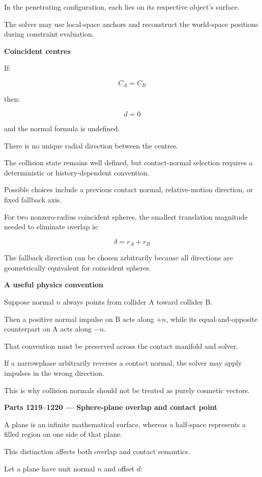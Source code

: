 In the penetrating configuration, each lies on its respective object's surface.

The solver may use local-space anchors and reconstruct the world-space positions during constraint evaluation.

\textbf{Coincident centres}

If:

\[
C_A=C_B
\]

then:

\[
d=0
\]

and the normal formula is undefined.

There is no unique radial direction between the centres.

The collision state remains well defined, but contact-normal selection requires a deterministic or history-dependent convention.

Possible choices include a previous contact normal, relative-motion direction, or fixed fallback axis.

For two nonzero-radius coincident spheres, the smallest translation magnitude needed to eliminate overlap is:

\[
\delta=r_A+r_B
\]

The fallback direction can be chosen arbitrarily because all directions are geometrically equivalent for coincident spheres.

\textbf{A useful physics convention}

Suppose normal \(n\) always points from collider A toward collider B.

Then a positive normal impulse on B acts along \(+n\), while its equal-and-opposite counterpart on A acts along \(-n\).

That convention must be preserved across the contact manifold and solver.

If a narrowphase arbitrarily reverses a contact normal, the solver may apply impulses in the wrong direction.

This is why collision normals should not be treated as purely cosmetic vectors.

\textbf{Parts 1219--1220 --- Sphere-plane overlap and contact point}

A plane is an infinite mathematical surface, whereas a half-space represents a filled region on one side of that plane.

This distinction affects both overlap and contact semantics.

Let a plane have unit normal \(n\) and offset \(d\):

